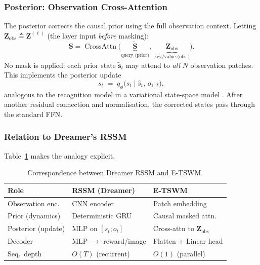 \documentclass[conference]{IEEEtran}
\begin{document}
\subsubsection{Posterior: Observation Cross-Attention}

The posterior corrects the causal prior using the full observation context. Letting $\mathbf{Z}_{\mathrm{obs}} \triangleq \mathbf{Z}^{(\ell)}$ (the layer input \emph{before} masking):
\begin{equation}\label{eq:posterior}
    \mathbf{S} = \operatorname{CrossAttn}\!\bigl(\underbrace{\tilde{\mathbf{S}}}_{\text{query (prior)}},\; \underbrace{\mathbf{Z}_{\mathrm{obs}}}_{\text{key/value (obs.)}}\bigr).
\end{equation}
No mask is applied: each prior state $\tilde{\mathbf{s}}_t$ may attend to \emph{all} $N$ observation patches. This implements the posterior update
\begin{equation}
    s_t \;=\; q_\phi\!\bigl(s_t \mid \hat{s}_t,\, o_{1:T}\bigr),
\end{equation}
analogous to the recognition model in a variational state-space model \cite{b_dreamer}. After another residual connection and normalisation, the corrected states pass through the standard FFN.

\subsubsection{Relation to Dreamer's RSSM}

Table~\ref{tab:wm} makes the analogy explicit.

\begin{table}[t]
\caption{Correspondence between Dreamer RSSM and E-TSWM.}
\vspace{-2mm}
\begin{center}\small
\begin{tabular}{lll}
\toprule
\textbf{Role} & \textbf{RSSM (Dreamer)} & \textbf{E-TSWM} \\
\midrule
Observation enc. & CNN encoder & Patch embedding \\
Prior (dynamics) & Deterministic GRU & Causal masked attn. \\
Posterior (update) & MLP on $[\hat{s}_t; o_t]$ & Cross-attn to $\mathbf{Z}_{\mathrm{obs}}$ \\
Decoder & MLP $\to$ reward/image & Flatten + Linear head \\
\midrule
Seq.\ depth & $O(T)$ (recurrent) & $O(1)$ (parallel) \\
\bottomrule
\end{tabular}
\label{tab:wm}
\end{center}
\vspace{-4mm}
\end{table}
\end{document}
